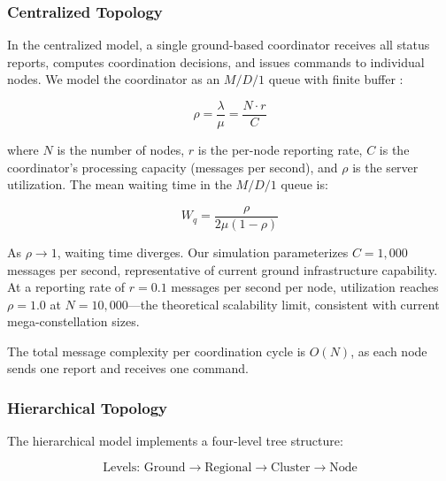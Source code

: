 \documentclass[journal]{IEEEtran}
\begin{document}
\subsubsection{Centralized Topology}

In the centralized model, a single ground-based coordinator receives all status reports, computes coordination decisions, and issues commands to individual nodes. We model the coordinator as an $M/D/1$ queue with finite buffer \cite{kleinrock_queueing}:

\begin{equation}
    \rho = \frac{\lambda}{\mu} = \frac{N \cdot r}{C}
    \label{eq:centralized_utilization}
\end{equation}

\noindent where $N$ is the number of nodes, $r$ is the per-node reporting rate, $C$ is the coordinator's processing capacity (messages per second), and $\rho$ is the server utilization. The mean waiting time in the $M/D/1$ queue is:

\begin{equation}
    W_q = \frac{\rho}{2\mu(1 - \rho)}
    \label{eq:md1_waiting}
\end{equation}

As $\rho \to 1$, waiting time diverges. Our simulation parameterizes $C = 1{,}000$ messages per second, representative of current ground infrastructure capability. At a reporting rate of $r = 0.1$ messages per second per node, utilization reaches $\rho = 1.0$ at $N = 10{,}000$---the theoretical scalability limit, consistent with current mega-constellation sizes.

The total message complexity per coordination cycle is $O(N)$, as each node sends one report and receives one command.

\subsubsection{Hierarchical Topology}

The hierarchical model implements a four-level tree structure:


\begin{equation}
    \text{Levels: Ground} \to \text{Regional} \to \text{Cluster} \to \text{Node}
    \label{eq:hierarchy}
\end{equation}
\end{document}

